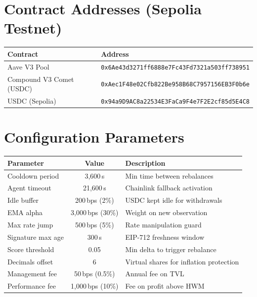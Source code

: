 \documentclass[12pt]{article}
\begin{document}
\appendix

\section{Contract Addresses (Sepolia Testnet)}

\begin{table}[H]
\centering
\small
\begin{tabular}{@{}ll@{}}
\toprule
\textbf{Contract} & \textbf{Address} \\
\midrule
Aave V3 Pool            & \texttt{0x6Ae43d3271ff6888e7Fc43Fd7321a503ff738951} \\
Compound V3 Comet (USDC)& \texttt{0xAec1F48e02Cfb822Be958B68C7957156EB3F0b6e} \\
USDC (Sepolia)          & \texttt{0x94a9D9AC8a22534E3FaCa9F4e7F2E2cf85d5E4C8} \\
\bottomrule
\end{tabular}
\end{table}

\section{Configuration Parameters}

\begin{table}[H]
\centering
\small
\begin{tabular}{@{}lcl@{}}
\toprule
\textbf{Parameter} & \textbf{Value} & \textbf{Description} \\
\midrule
Cooldown period    & 3{,}600\,s        & Min time between rebalances \\
Agent timeout      & 21{,}600\,s       & Chainlink fallback activation \\
Idle buffer        & 200\,bps (2\%)    & USDC kept idle for withdrawals \\
EMA alpha          & 3{,}000\,bps (30\%)& Weight on new observation \\
Max rate jump      & 500\,bps (5\%)    & Rate manipulation guard \\
Signature max age  & 300\,s            & EIP-712 freshness window \\
Score threshold    & 0.05              & Min delta to trigger rebalance \\
Decimals offset    & 6                 & Virtual shares for inflation protection \\
Management fee     & 50\,bps (0.5\%)   & Annual fee on TVL \\
Performance fee    & 1{,}000\,bps (10\%)& Fee on profit above HWM \\
\bottomrule
\end{tabular}
\end{table}
\end{document}
